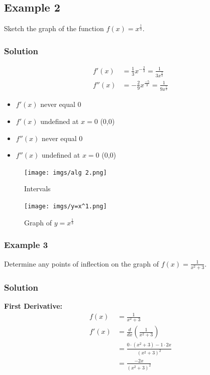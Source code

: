 \documentclass{article}
\begin{document}
\subsection*{Example 2}
Sketch the graph of the function $f(x)=x^{\frac{1}{3}}$.
\subsubsection*{Solution}
\begin{align*}
    f'(x)&=\frac{1}{3}x^{-\frac{2}{3}} = \frac{1}{3x^{\frac{2}{3}}}\\
    f''(x)&=-\frac{2}{9}x^{\frac{-5}{3}}=\frac{1}{9x^{\frac{5}{3}}}
\end{align*}
\begin{itemize}
    \item $f'(x)$ never equal 0
    \item $f'(x)$ undefined at $x=0$ (0,0)
    \item $f''(x)$ never equal 0
    \item $f''(x)$ undefined at $x=0$ (0,0)
\end{itemize}
\begin{figure}[h]
    \centering
    \begin{minipage}{0.5\textwidth}
        \centering
        \texttt{[image: imgs/alg 2.png]}
        \caption{Intervals}
        \label{fig:alg1}
    \end{minipage}%
    \begin{minipage}{0.5\textwidth}
        \centering
        \texttt{[image: imgs/y=x^1.png]}
        \caption{Graph of $y=x^{\frac{1}{3}}$}
        \label{fig:graph}
    \end{minipage}
\end{figure}
\newpage 
\subsubsection*{Example 3}
Determine any points of inflection on the graph of $f(x)=\frac{1}{x^2+3}$.
\subsubsection*{Solution}
\textbf{First Derivative:}
\begin{align*}
f(x) &= \frac{1}{x^2+3} \\
f'(x) &= \frac{d}{dx} \left(\frac{1}{x^2+3}\right) \\
     &= \frac{0 \cdot (x^2+3) - 1 \cdot 2x}{(x^2+3)^2} \\
     &= \frac{-2x}{(x^2+3)^2}
\end{align*}
\end{document}
